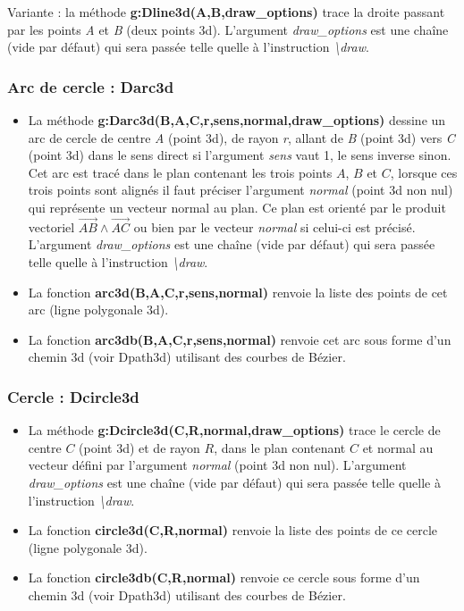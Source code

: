 \documentclass[%
10pt,%
a4paper,%
french,%
]%
{article}%
\begin{document}
Variante : la méthode \textbf{g:Dline3d(A,B,draw\_options)} trace la droite passant par les points \emph{A} et \emph{B} (deux points 3d). L'argument \emph{draw\_options} est une chaîne (vide par défaut) qui sera passée telle quelle à l'instruction \emph{\textbackslash draw}.

 \subsubsection{Arc de cercle : Darc3d}
 
\begin{itemize}
    \item La méthode \textbf{g:Darc3d(B,A,C,r,sens,normal,draw\_options)} dessine un arc de cercle de centre \emph{A} (point 3d), de rayon \emph{r}, allant de \emph{B} (point 3d) vers \emph{C} (point 3d) dans le sens direct si l'argument \emph{sens} vaut 1, le sens inverse sinon. Cet arc est tracé dans le plan contenant les trois points $A$, $B$ et $C$, lorsque ces trois points sont alignés il faut préciser l'argument \emph{normal} (point 3d non nul) qui représente un vecteur normal au plan. Ce plan est orienté par le produit vectoriel $\vec{AB}\wedge\vec{AC}$ ou bien par le vecteur \emph{normal} si celui-ci est précisé. L'argument \emph{draw\_options} est une chaîne (vide par défaut) qui sera passée telle quelle à l'instruction \emph{\textbackslash draw}.
    
    \item La fonction \textbf{arc3d(B,A,C,r,sens,normal)} renvoie la liste des points de cet arc (ligne polygonale 3d). 
    
    \item La fonction \textbf{arc3db(B,A,C,r,sens,normal)} renvoie cet arc sous forme d'un chemin 3d (voir Dpath3d) utilisant des courbes de Bézier.
\end{itemize}

\subsubsection{Cercle : Dcircle3d}

\begin{itemize}
    \item La méthode \textbf{g:Dcircle3d(C,R,normal,draw\_options)} trace le cercle de centre $C$ (point 3d) et de rayon $R$, dans le plan contenant $C$ et normal au vecteur défini par l'argument \emph{normal} (point 3d non nul). L'argument \emph{draw\_options} est une chaîne (vide par défaut) qui sera passée telle quelle à l'instruction \emph{\textbackslash draw}.
    
    \item La fonction \textbf{circle3d(C,R,normal)} renvoie la liste des points de ce cercle (ligne polygonale 3d). 
    
    \item La fonction \textbf{circle3db(C,R,normal)} renvoie ce cercle sous forme d'un chemin 3d (voir Dpath3d) utilisant des courbes de Bézier.
\end{itemize}
    
\end{document}
